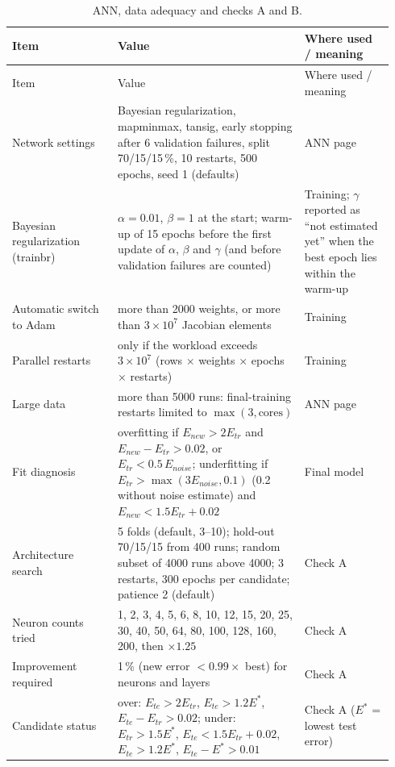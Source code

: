 {\small\begin{longtable}{@{}p{0.26\linewidth}p{0.46\linewidth}p{0.22\linewidth}@{}}
\caption{ANN, data adequacy and checks A and B.}\label{tab:a-const-ann}\\
\toprule
Item & Value & Where used / meaning \\
\midrule
\endfirsthead
\toprule
Item & Value & Where used / meaning \\
\midrule
\endhead
\bottomrule
\endfoot
Network settings & Bayesian regularization, mapminmax, tansig, early stopping after 6 validation failures, split
  70/15/15\,\%, 10 restarts, 500 epochs, seed 1 (defaults) & ANN page \\
Bayesian regularization (trainbr) & $\alpha = 0.01$, $\beta = 1$ at the start; warm-up of 15 epochs before the
  first update of $\alpha$, $\beta$ and $\gamma$ (and before validation failures are counted) & Training; $\gamma$
  reported as ``not estimated yet'' when the best epoch lies within the warm-up \\
Automatic switch to Adam & more than 2000 weights, or more than $3\times10^7$ Jacobian elements & Training \\
Parallel restarts & only if the workload exceeds $3\times10^7$ (rows $\times$ weights $\times$ epochs $\times$
  restarts) & Training \\
Large data & more than 5000 runs: final-training restarts limited to $\max(3, \text{cores})$ & ANN page \\
Fit diagnosis & overfitting if $E_{new} > 2E_{tr}$ and $E_{new}-E_{tr} > 0.02$, or $E_{tr} < 0.5\,E_{noise}$;
  underfitting if $E_{tr} > \max(3E_{noise}, 0.1)$ (0.2 without noise estimate) and $E_{new} < 1.5E_{tr}+0.02$ &
  Final model \\
Architecture search & 5 folds (default, 3--10); hold-out 70/15/15 from 400 runs; random subset of 4000 runs above
  4000; 3 restarts, 300 epochs per candidate; patience 2 (default) & Check A \\
Neuron counts tried & 1, 2, 3, 4, 5, 6, 8, 10, 12, 15, 20, 25, 30, 40, 50, 64, 80, 100, 128, 160, 200, then
  $\times 1.25$ & Check A \\
Improvement required & 1\,\% (new error $< 0.99\times$ best) for neurons and layers & Check A \\
Candidate status & over: $E_{te} > 2E_{tr}$, $E_{te} > 1.2E^*$, $E_{te}-E_{tr} > 0.02$; under: $E_{tr} > 1.5E^*$,
  $E_{te} < 1.5E_{tr}+0.02$, $E_{te} > 1.2E^*$, $E_{te}-E^* > 0.01$ & Check A ($E^*$ = lowest test error) \\

\end{longtable}}
